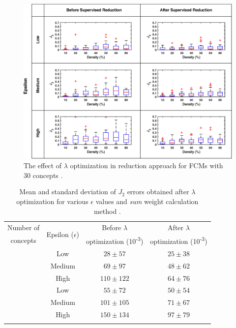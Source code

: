 \documentclass[graybox]{svmult}
\begin{document}
\begin{figure}[hbt]
  \includegraphics[width=\textwidth]{j2_sup_c30.eps}
  \caption{The effect of $\lambda$ optimization in reduction approach for 
  FCMs with 30 concepts \cite{hatwagner2018two}.}
  \label{fig:learning30}
\end{figure}

\begin{table}[!t]
  \caption{Mean and standard deviation of $J_2$ errors obtained after $\lambda$ 
  optimization for various $\epsilon$ values and \emph{sum} weight 
  calculation method \cite{hatwagner2018two}.}
  \label{tbl:BBBCBeforeAfter}
  \centering
  \begin{tabular}{cccc}
    \hline\noalign{\smallskip}
    Number of & \multirow{2}{*}{Epsilon ($\epsilon$)} & Before $\lambda$ & After $\lambda$ \\
    concepts & & optimization (10\textsuperscript{-3}) & optimization (10\textsuperscript{-3}) \\
    \noalign{\smallskip}\svhline\noalign{\smallskip}
    \multirow{3}{*}{20} & Low & $28 \pm 57$ & $25 \pm 38$ \\
    & Medium & $69 \pm 97$ & $48 \pm 62$ \\
    & High & $110 \pm 122$ & $64 \pm 76$ \\
    \noalign{\smallskip}\hline\noalign{\smallskip}
    \multirow{3}{*}{30} & Low & $55 \pm 72$ & $50 \pm 54$ \\
    & Medium & $101 \pm 105$ & $71 \pm 67$ \\
    & High & $150 \pm 134$ & $97 \pm 79$ \\
    \noalign{\smallskip}\hline\noalign{\smallskip}
  \end{tabular}
\end{table}
\end{document}
